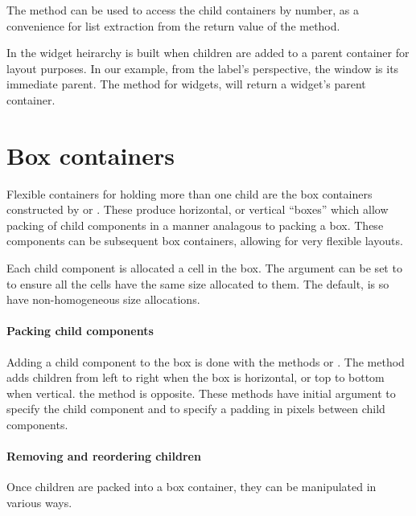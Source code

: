The \method{[[}{GObject} method 
can be used to access
the child containers by number, as a convenience for list extraction
from the return value of the  method.

In \GTK{} the widget heirarchy is built when children are added to a
parent container for layout purposes.
In our example, from the label's perspective, the window is its immediate parent. The
 method for \GTK\/ widgets, will return a widget's
parent container.


\section{Box containers}
\label{sec:RGtk2:BoxContainers}

Flexible containers for holding more than one child are the box
containers constructed by  or .
These produce horizontal, or vertical ``boxes'' which allow packing of
child components in a manner analagous to packing a box. These
components can be subsequent box containers, allowing for very
flexible layouts.

Each child component is allocated a cell in the box.  The
 argument can be set to  to
ensure all the cells have the same size allocated to them. The
default, is so have non-homogeneous size allocations. 

\paragraph{Packing child components}
Adding a child component to the box is done with the methods
 or . The
 method adds children from left to right
when the box is horizontal, or top to bottom when vertical. the
 method is opposite. These methods have
initial argument  to specify the
child component and  to specify a
padding in pixels between child components.




\paragraph{Removing and reordering children}
Once children are packed into a box container, they can be manipulated
in various ways.


